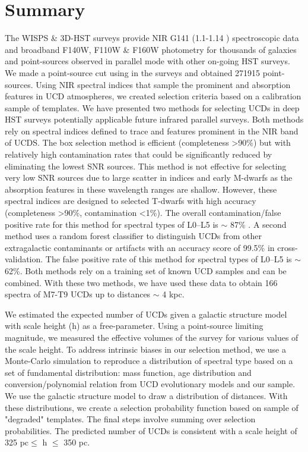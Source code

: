 \documentclass[manuscript]{aastex63}
\begin{document}
\section{Summary}
The WISPS \& 3D-HST surveys provide NIR G141 (1.1-1.14 \micron) spectroscopic data and broadband F140W, F110W \& F160W photometry for thousands of galaxies and point-sources observed in parallel mode with other on-going HST surveys. We made a point-source cut using in the surveys and obtained 271915 point-sources. Using NIR spectral indices that sample the prominent \wat and \meth absorption features in UCD atmospheres, we created selection criteria based on a calibration sample of templates. We have presented two methods for selecting UCDs in deep HST surveys potentially applicable future infrared parallel surveys. Both methods rely on spectral indices defined to trace \wat and \meth features prominent in the NIR band of UCDS. The box selection method is efficient (completeness \textgreater 90\%) but with relatively high contamination rates that could be significantly reduced by eliminating the lowest SNR sources. This method is not effective for selecting very low SNR sources due to large scatter in indices and early M-dwarfs as the absorption features in these wavelength ranges are shallow. However, these spectral indices are designed to selected T-dwarfs with high accuracy (completeness \textgreater 90\%, contamination \textless 1\%). The overall contamination/false positive rate for this method for spectral types of L0--L5 is $\sim$ 87\% . A second method uses a random forest classifier to distinguish UCDs from other extragalactic contaminants or artifacts with an accuracy score of 99.5\% in cross-validation. The false positive rate of this method  for spectral types of L0--L5 is $\sim$62\%. Both methods rely on a training set of known UCD samples and can be combined.
 With these two methods, we have used these data to obtain 166 spectra of M7-T9 UCDs up to distances $\sim$ 4 kpc. 

We estimated the expected number of UCDs given a galactic structure model with scale height (h) as a free-parameter. Using a point-source limiting magnitude, we measured the effective volumes of the survey for various values of the scale height. To address intrinsic biases in our selection method, we use a Monte-Carlo simulation to reproduce a distribution of spectral type based on a set of fundamental distribution: mass function, age distribution and conversion/polynomial relation from UCD evolutionary models and our sample. We use the galactic structure model to draw a distribution of distances. With these distributions, we create a selection probability function based on sample of "degraded" templates. The final steps involve summing over selection probabilities. The predicted number of UCDs is consistent with a scale height of 325 pc$\leq$ h $\leq$ 350 pc.  
\end{document}
